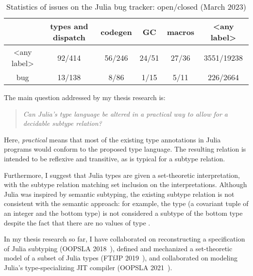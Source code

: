 \begin{table}[t]
\caption{Statistics of issues on the Julia bug tracker: open/closed (March 2023)}\label{tab:julia-issues-stats}
\vspace*{0.25em}
\centering\footnotesize
\begin{tabular}{c|ccccc}
 & types and dispatch & codegen & GC & macros & <any label> \\
\midrule
<any label> &
  92/414 & 56/246 & 24/51 & 27/36 & 3551/19238 \\
bug &
  13/138 & 8/86 & 1/15 & 5/11 & 226/2664
\end{tabular}
\end{table}

The main question addressed by my thesis research is:
\begin{quote}
\emph{Can Julia's type language be altered in a practical way
to allow for a decidable subtype relation?}
\end{quote}
Here, \emph{practical} means that most of the existing type annotations
in Julia programs would conform to the proposed type language.
The resulting relation is intended to be reflexive and transitive, as is
typical for a subtype relation. 

Furthermore, I suggest that Julia types are given a set-theoretic interpretation,
with the subtype relation matching set inclusion on the interpretations.
Although Julia was inspired by semantic subtyping, the existing subtype relation
is not consistent with the semantic approach: for example, the type 
 (a covariant tuple of an integer and the bottom type)
is not considered a subtype of the bottom type despite the fact that there are
no values of type .

In my thesis research so far,
I have collaborated on reconstructing a specification of Julia subtyping
(OOPSLA 2018~\cite{TODO}),
defined and mechanized a set-theoretic model of a subset of Julia types
(FTfJP 2019~\cite{TODO}),
and collaborated on modeling Julia's type-specializing JIT compiler
(OOPSLA 2021~\cite{TODO}).

